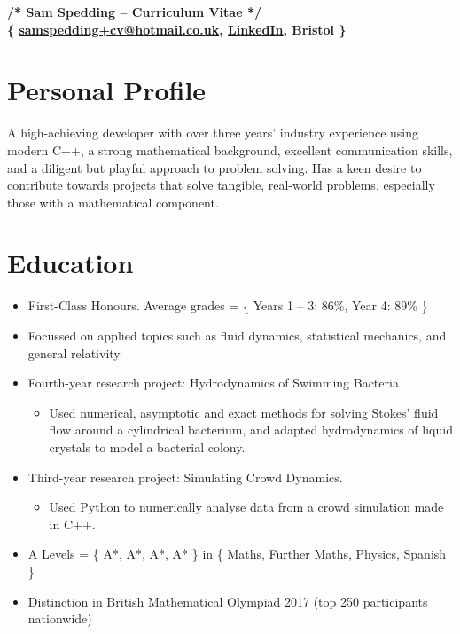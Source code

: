 \documentclass{my_cv}
\begin{document}
\begin{center}
\bfseries
\color{ForestGreen}
/* Sam Spedding -- Curriculum Vitae */\\[0.5cm]
\color{MidnightBlue}
\{ \href{samspedding+cv@hotmail.co.uk}{samspedding+cv@hotmail.co.uk}, \href{https://www.linkedin.com/in/sam-s-629b09115/}{\underline{LinkedIn}}, Bristol \}
\vspace{0.5cm}
\end{center}

\section{Personal Profile}
A high-achieving developer with over three years' industry experience using modern C++, a strong mathematical background, excellent communication skills, and a diligent but playful approach to problem solving. Has a keen desire to contribute towards projects that solve tangible, real-world problems, especially those with a mathematical component.

\section{Education}
\begin{itemize}
	\color{MidnightBlue}
	\item First-Class Honours. Average grades = \{ Years 1 -- 3: 86\%,  Year 4: 89\% \}
	\item Focussed on applied topics such as fluid dynamics, statistical mechanics, and general relativity
	\item Fourth-year research project: Hydrodynamics of Swimming Bacteria
	\begin{itemize}
		\item Used numerical, asymptotic and exact methods for solving Stokes' fluid flow around a cylindrical bacterium, and adapted hydrodynamics of liquid crystals to model a bacterial colony.
	\end{itemize}
	\item Third-year research project: Simulating Crowd Dynamics. 
	\begin{itemize}
		\item Used Python to numerically analyse data from a crowd simulation made in C++.
	\end{itemize}
\end{itemize}

\begin{itemize}
	\color{MidnightBlue}
	\item A Levels = \{ A*, A*, A*, A* \} in \{ Maths, Further Maths, Physics, Spanish \}
	\item Distinction in British Mathematical Olympiad 2017 (top 250 participants nationwide)
\end{itemize}
\end{document}

